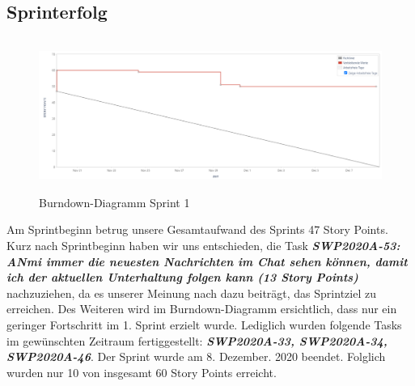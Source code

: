 \documentclass[12pt,a4paper, oneside]{article}
\begin{document}
    \subsection{Sprinterfolg}

    \begin{figure}[h]
        \centering
        \includegraphics[width=\textwidth, height=5cm]{img/sprint_01/Burndown-Sprint1.PNG}
        \caption{Burndown-Diagramm Sprint 1}
        \label{fig: Burndown-Sprint1}
    \end{figure}

    \noindent
    Am Sprintbeginn betrug unsere Gesamtaufwand des Sprints 47 Story Points. Kurz nach Sprintbeginn haben wir uns entschieden, die Task \textit{\textbf{SWP2020A-53: ANmi immer die neuesten Nachrichten im Chat sehen können, damit ich der aktuellen Unterhaltung folgen kann (13 Story Points)}} nachzuziehen, da es unserer Meinung nach dazu beiträgt, das Sprintziel zu erreichen. Des Weiteren wird im Burndown-Diagramm ersichtlich, dass nur ein geringer Fortschritt im 1. Sprint erzielt wurde. Lediglich wurden folgende Tasks im gewünschten Zeitraum fertiggestellt: \textit{\textbf{ SWP2020A-33, SWP2020A-34, SWP2020A-46}}. Der Sprint wurde am 8. Dezember. 2020 beendet. Folglich wurden nur 10 von insgesamt 60 Story Points erreicht.
\end{document}
